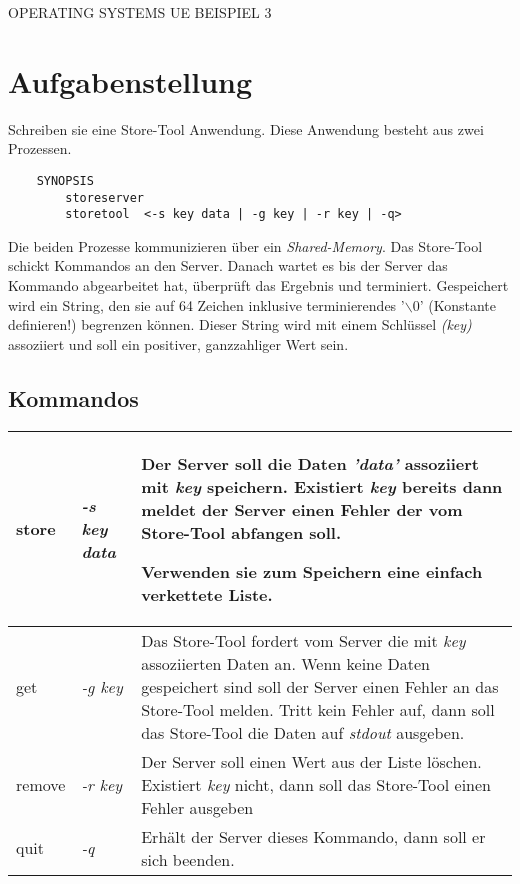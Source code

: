 \documentclass{article}
\begin{document}
\begin{center}
\begin{Large}
OPERATING SYSTEMS UE BEISPIEL 3
\end{Large}
\end{center}

\section*{Aufgabenstellung}

Schreiben sie eine Store-Tool Anwendung. Diese Anwendung besteht aus zwei Prozessen.

\begin{verbatim}
    SYNOPSIS
        storeserver
        storetool  <-s key data | -g key | -r key | -q>
\end{verbatim}

Die beiden Prozesse kommunizieren über ein {\em Shared-Memory}. Das Store-Tool schickt Kommandos an den Server. Danach wartet es bis der Server das Kommando abgearbeitet hat, überprüft das Ergebnis und terminiert.
Gespeichert wird ein String, den sie auf 64 Zeichen inklusive terminierendes '$\backslash$0' (Konstante definieren!) begrenzen können. Dieser String wird mit einem Schlüssel \emph{(key)} assoziiert und soll ein positiver, ganzzahliger Wert sein.

\subsection*{Kommandos}
\begin{center}
\begin{tabular}{llp{10cm}}
\hline
store & \emph{-s key data} & Der Server soll die Daten \emph{'data'} assoziiert mit \emph{key} speichern. Existiert \emph{key} bereits dann meldet der Server einen Fehler der vom Store-Tool abfangen soll. 

Verwenden sie zum Speichern eine einfach verkettete Liste. \\ 
\hline
get & \emph{-g key} & Das Store-Tool fordert vom Server die mit \emph{key} assoziierten Daten an. Wenn keine Daten gespeichert sind soll der Server einen Fehler an das Store-Tool melden. Tritt kein Fehler auf, dann soll das Store-Tool die Daten auf \emph{stdout} ausgeben. \\
\hline
remove & \emph{-r key} & Der Server soll einen Wert aus der Liste löschen. Existiert \emph{key} nicht, dann soll das Store-Tool einen Fehler ausgeben \\
\hline
quit & \emph{-q} & Erhält der Server dieses Kommando, dann soll er sich beenden. \\
\hline
\end{tabular}
\end{center}
 
\end{document}
